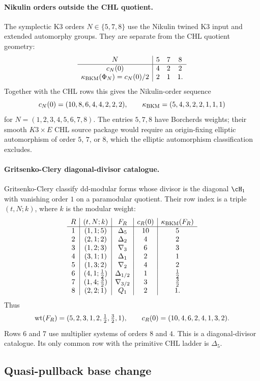\paragraph{Nikulin orders outside the CHL quotient.}
The symplectic K3 orders $N\in\{5,7,8\}$ use the Nikulin twined K3
input and extended automorphy groups.  They are separate from the CHL
quotient geometry:
\[
\begin{array}{c|ccc}
N & 5 & 7 & 8\\ \hline
c_N(0) & 4 & 2 & 2\\
\kappa_{\mathrm{BKM}}(\Phi_N)=c_N(0)/2 & 2 & 1 & 1 .
\end{array}
\]
Together with the CHL rows this gives the Nikulin-order sequence
\[
  c_N(0)=(10,8,6,4,4,2,2,2),\qquad
  \kappa_{\mathrm{BKM}}=(5,4,3,2,2,1,1,1)
\]
for $N=(1,2,3,4,5,6,7,8)$.  The entries $5,7,8$ have Borcherds weights;
their smooth $K3\times E$ CHL source package would require an
origin-fixing elliptic automorphism of order $5$, $7$, or $8$, which the
elliptic automorphism classification excludes.

\paragraph{Gritsenko-Clery diagonal-divisor catalogue.}
Gritsenko-Clery classify dd-modular forms whose divisor is the diagonal
$\cH_1$ with vanishing order $1$ on a paramodular quotient.  Their row
index is a triple $(t,N;k)$, where $k$ is the modular weight:
\[
\begin{array}{c|c|c|c|c}
R & (t,N;k) & F_R & c_R(0) & \kappa_{\mathrm{BKM}}(F_R)\\ \hline
1 & (1,1;5) & \Delta_5 & 10 & 5\\
2 & (2,1;2) & \Delta_2 & 4 & 2\\
3 & (1,2;3) & \nabla_3 & 6 & 3\\
4 & (3,1;1) & \Delta_1 & 2 & 1\\
5 & (1,3;2) & \nabla_2 & 4 & 2\\
6 & (4,1;\tfrac12) & \Delta_{1/2} & 1 & \tfrac12\\
7 & (1,4;\tfrac32) & \nabla_{3/2} & 3 & \tfrac32\\
8 & (2,2;1) & Q_1 & 2 & 1 .
\end{array}
\]
Thus
\[
  \mathrm{wt}(F_R)=(5,2,3,1,2,\tfrac12,\tfrac32,1),
  \qquad
  c_R(0)=(10,4,6,2,4,1,3,2).
\]
Rows $6$ and $7$ use multiplier systems of orders $8$ and $4$.  This is
a diagonal-divisor catalogue.  Its only common row with the primitive
CHL ladder is $\Delta_5$.

\subsection*{Quasi-pullback base change}

